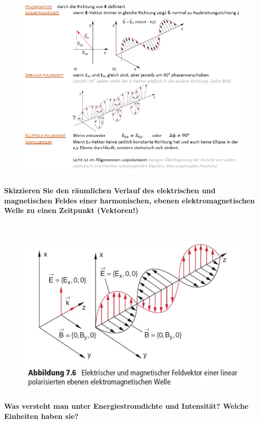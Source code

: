 \documentclass[a4paper, 11pt, ngerman, parskip=half]{scrartcl}
\begin{document}
\begin{figure}[H]
    \centering
    \includegraphics[width=14cm]{image/13/3.png}
\end{figure}

\paragraph{Skizzieren Sie den räumlichen Verlauf des elektrischen und magnetischen Feldes einer
harmonischen, ebenen elektromagnetischen Welle zu einen Zeitpunkt (Vektoren!)} ~

\begin{figure}[H]
    \centering
    \includegraphics[width=10 cm]{image/13/4.png}
\end{figure}

\paragraph{Was versteht man unter Energiestromdichte und Intensität? Welche Einheiten haben sie?} ~
\end{document}
